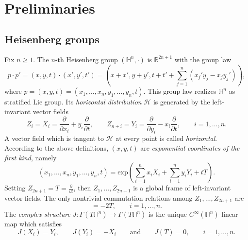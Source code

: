 \documentclass[11pt]{amsart}
\renewcommand{\geq}{\geqslant}
\newcommand{\hhh}{{\mathcal{H}}}
\newcommand{\hn}{\mathbb{H}^n}
\newcommand{\hh}{{\mathbb{H}}}
\theoremstyle{definition}
\theoremstyle{remark}
\numberwithin{equation}{section}
\begin{document}
\section{Preliminaries}\label{sec_prel}
\subsection{Heisenberg groups}\label{subsec_hg} Fix $n\geq 1$. The $n$-th Heisenberg group $(\hn,\cdot)$ is $\mathbb R^{2n+1}$ with the group law
\begin{equation}
\label{eq:Hproduct}
    p\cdot p'=( x, y,t)\cdot (x',y',t')=\left( x+ x', y+ y', t+t'+\sum_{j=1}^n\left(x_j'y_j-x_jy_j'\right)\right),
\end{equation}
where $p=(x,y,t)=(x_1,\ldots,x_n,y_1,\ldots,y_n,t)$.
This group law realizes $\hn$ as stratified Lie group. Its \emph{horizontal distribution} $\hhh$ is generated by the left-invariant vector fields
\begin{equation*}
    Z_i=X_i=\frac{\partial}{\partial x_i}+y_i\frac{\partial}{\partial t},\qquad Z_{n+i}=Y_i=\frac{\partial}{\partial y_i}-x_i\frac{\partial}{\partial t},\qquad i=1,\ldots,n.
\end{equation*}
 A vector field which is tangent to $\hhh$ at every point is called \emph{horizontal}.
According to the above definitions, $(x,y,t)$ are \emph{exponential coordinates of the first kind}, namely
\begin{equation*}
    (x_1,\ldots,x_n,y_1,\ldots,y_n,t)=\mathrm{exp}\left(\sum_{i=1}^nx_i X_i+\sum_{i=1}^n y_i Y_i+tT\right).
\end{equation*}
 Setting $Z_{2n+1}=T=\frac{\partial}{\partial t}$, then $
Z_1,\ldots,Z_{2n+1}
$ is a global frame of left-invariant vector fields. 
The only nontrivial commutation relations among $Z_1,\ldots,Z_{2n+1}$ are
\begin{equation*}
    [X_i,Y_i]=-2T,\qquad i=1,\ldots,n.
\end{equation*}
The \emph{complex structure} $J:\Gamma(T\hh^n)\to\Gamma(T\hh^n)$ is the unique $C^\infty(\hh^n)$-linear map which satisfies
\begin{equation*}
    J(X_i)=Y_i,\qquad J(Y_i)=-X_i\qquad\text{and}\qquad J(T)=0,\qquad i=1,\ldots,n.
\end{equation*}
\end{document}

